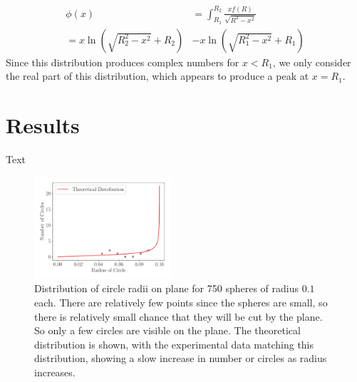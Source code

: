 \documentclass[journal]{IEEEtran}
\begin{document}
\begin{equation}
\begin{split}
  \phi(x) & = \int_{R_1}^{R_2}\frac{xf(R)}{\sqrt{R^2 - x^2}} \\
  = x\ln\left(\sqrt{R_2^2 - x^2}+R_2\right) & - x\ln\left(\sqrt{R_1^2 - x^2}+R_1\right)
\end{split}
\end{equation}
Since this distribution produces complex numbers for $ x < R_1$, we only
consider the real part of this distribution, which appears to produce a peak at
$x = R_1$.

\section{Results}
Text


\begin{figure}[H]%
\begin{center}
\includegraphics[width=0.45\textwidth]{./../Figures/750_01.pdf}
\caption{Distribution of circle radii on plane for 750 spheres of radius $0.1$
  each. There are relatively few points since the spheres are small, so there is
  relatively small chance that they will be cut by the plane. So only a few
  circles are visible on the plane. The theoretical distribution is shown, with
  the experimental data matching this distribution, showing a slow increase in
  number or circles as radius increases.}\label{fig:size1}
\end{center}
\end{figure}
\end{document}
